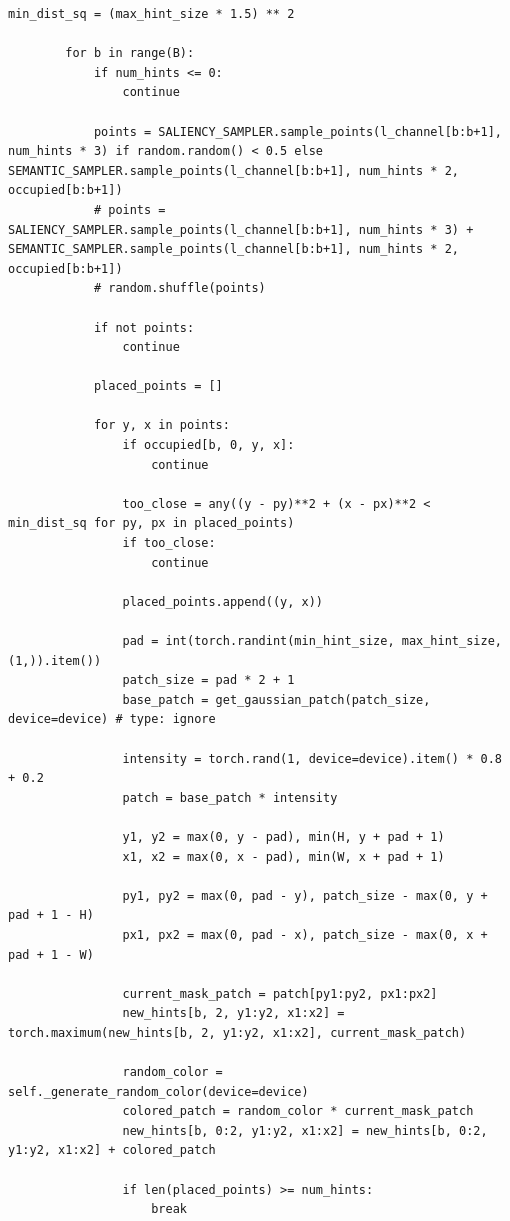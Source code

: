 \begin{lstlisting}[caption={Методи стохастичної генерації варіантів колоризації}]
        min_dist_sq = (max_hint_size * 1.5) ** 2 

        for b in range(B):
            if num_hints <= 0:
                continue

            points = SALIENCY_SAMPLER.sample_points(l_channel[b:b+1], num_hints * 3) if random.random() < 0.5 else SEMANTIC_SAMPLER.sample_points(l_channel[b:b+1], num_hints * 2, occupied[b:b+1])
            # points = SALIENCY_SAMPLER.sample_points(l_channel[b:b+1], num_hints * 3) + SEMANTIC_SAMPLER.sample_points(l_channel[b:b+1], num_hints * 2, occupied[b:b+1])
            # random.shuffle(points)

            if not points:
                continue

            placed_points = []

            for y, x in points:
                if occupied[b, 0, y, x]:
                    continue

                too_close = any((y - py)**2 + (x - px)**2 < min_dist_sq for py, px in placed_points)
                if too_close:
                    continue

                placed_points.append((y, x))

                pad = int(torch.randint(min_hint_size, max_hint_size, (1,)).item())
                patch_size = pad * 2 + 1
                base_patch = get_gaussian_patch(patch_size, device=device) # type: ignore

                intensity = torch.rand(1, device=device).item() * 0.8 + 0.2
                patch = base_patch * intensity

                y1, y2 = max(0, y - pad), min(H, y + pad + 1)
                x1, x2 = max(0, x - pad), min(W, x + pad + 1)

                py1, py2 = max(0, pad - y), patch_size - max(0, y + pad + 1 - H)
                px1, px2 = max(0, pad - x), patch_size - max(0, x + pad + 1 - W)

                current_mask_patch = patch[py1:py2, px1:px2]
                new_hints[b, 2, y1:y2, x1:x2] = torch.maximum(new_hints[b, 2, y1:y2, x1:x2], current_mask_patch)

                random_color = self._generate_random_color(device=device)
                colored_patch = random_color * current_mask_patch
                new_hints[b, 0:2, y1:y2, x1:x2] = new_hints[b, 0:2, y1:y2, x1:x2] + colored_patch

                if len(placed_points) >= num_hints:
                    break


\end{lstlisting}
